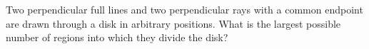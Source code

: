 Two perpendicular full lines and two perpendicular rays with a common endpoint are drawn through a disk in arbitrary positions. What is the largest possible number of regions into which they divide the disk?
